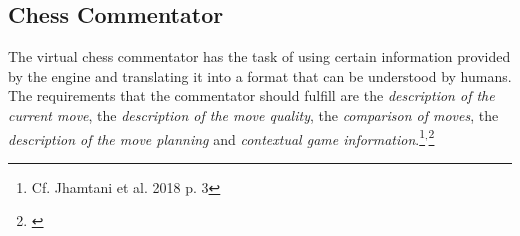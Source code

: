 



\subsection{Chess Commentator}

The virtual chess commentator has the task of using certain information provided by the engine and translating it into a format that can be understood by humans. The requirements that the commentator should fulfill are the \textit{description of the current move}, the \textit{description of the move quality}, the \textit{comparison of moves}, the \textit{description of the move planning} and \textit{contextual game information}.\footnote{Cf. Jhamtani et al. 2018 p. 3}$^{,}$\footnote{\cite{zang-etal-2019-automated}}